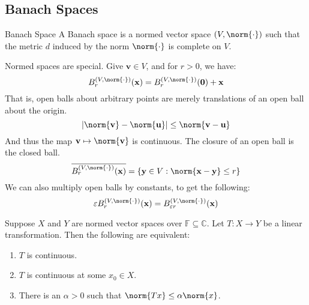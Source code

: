 \documentclass[crop=false,class=book,oneside]{standalone}
\begin{document}
        \subsection{Banach Spaces}
        \begin{ldefinition}{Banach Space}
            A Banach space is a normed vector space
            $(V,\norm{\cdot})$ such that the metric $d$ induced by
            the norm $\norm{\cdot}$ is complete on $V$.
        \end{ldefinition}
        Normed spaces are special. Give $\mathbf{v}\in{V}$, and
        for $r>0$, we have:
        \begin{equation}
            B_{r}^{(V,\norm{\cdot})}(\mathbf{x})=
            B_{r}^{(V,\norm{\cdot})}(\mathbf{0})+\mathbf{x}
        \end{equation}
        That is, open balls about arbitrary points are merely
        translations of an open ball about the origin.
        \begin{equation}
            |\norm{\mathbf{v}}-\norm{\mathbf{u}}|
            \leq\norm{\mathbf{v}-\mathbf{u}}
        \end{equation}
        And thus the map $\mathbf{v}\mapsto\norm{\mathbf{v}}$ is
        continuous. The closure of an open ball is the closed ball.
        \begin{equation}
            \overline{B_{r}^{(V,\norm{\cdot})}(\mathbf{x})}
            =\{\mathbf{y}\in{V}:
                \norm{\mathbf{x}-\mathbf{y}}\leq{r}\}
        \end{equation}
        We can also multiply open balls by constants, to get
        the following:
        \begin{equation}
            \varepsilon{B}_{r}^{(V,\norm{\cdot})}(\mathbf{x})=
            B_{\varepsilon{r}}^{(V,\norm{\cdot})}(\mathbf{x})
        \end{equation}
        \begin{theorem}
            Suppose $X$ and $Y$ are normed vector spaces over
            $\mathbb{F}\subseteq\mathbb{C}$. Let $T:X\rightarrow{Y}$
            be a linear transformation. Then the following
            are equivalent:
            \begin{enumerate}
                \item $T$ is continuous.
                \item $T$ is continuous at some $x_{0}\in{X}$.
                \item There is an $\alpha>0$ such that
                      $\norm{Tx}\leq\alpha\norm{x}$.
            \end{enumerate}
        \end{theorem}
\end{document}
